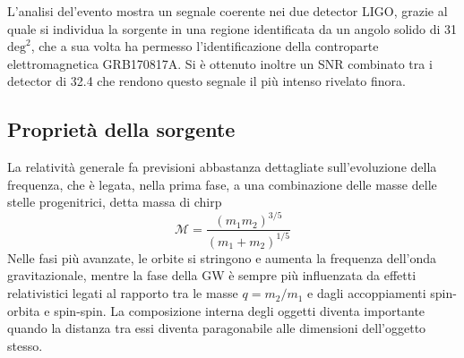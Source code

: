 L'analisi del'evento mostra un segnale coerente nei due detector LIGO, grazie al quale si individua la sorgente in una regione identificata da un angolo solido di 31 $\text{deg}^2$, che a sua volta ha permesso l'identificazione della controparte elettromagnetica GRB170817A. 
Si è ottenuto inoltre un SNR combinato tra i detector di 32.4 che rendono questo segnale il più intenso rivelato finora.\cite{Abbott_2017a}

\subsection{Proprietà della sorgente}
\label{subsection:proprietàSorgGW170817}
La relatività generale fa previsioni abbastanza dettagliate sull'evoluzione della frequenza, che è legata, nella prima fase, a una combinazione delle masse delle stelle progenitrici, detta massa di chirp 
\begin{equation}
	\mathcal{M} = \frac{(m_1m_2)^{3/5}}{(m_1+m_2)^{1/5}}
	\label{eqn:chirpmass}
\end{equation}
Nelle fasi più avanzate, le orbite si stringono e aumenta la frequenza dell'onda gravitazionale, mentre la fase della GW è sempre più influenzata da effetti relativistici legati al rapporto tra le masse $q = m_2/m_1$ e dagli accoppiamenti spin-orbita e spin-spin. 
La composizione interna degli oggetti diventa importante quando la distanza tra essi diventa paragonabile alle dimensioni dell'oggetto stesso. 


